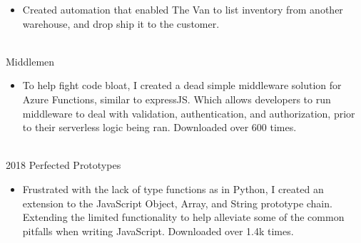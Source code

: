 \documentclass[letterpaper]{twentysecondcv} %
\begin{document}
\begin{twenty}
{\begin{itemize}
            \item Created automation that enabled The Van to list inventory from another warehouse, and drop ship it to the customer. 
        \end{itemize}
        }
    \\
    \twentyitem
    	{}
		{}
        {Middlemen}
        {}
        {}
        {
        \begin{itemize}
            \item To help fight code bloat, I created a dead simple middleware solution for Azure Functions, similar to expressJS. Which allows developers to run middleware to deal with validation, authentication, and authorization, prior to their serverless logic being ran. Downloaded over 600 times. 
            \vspace{1mm}
        \end{itemize}
        }
    \\
    \twentyitem
    	{2018}
		{}
        {Perfected Prototypes}
        {}
        {}
        {
        \begin{itemize}
            \item Frustrated with the lack of type functions as in Python, I created an extension to the JavaScript Object, Array, and String prototype chain. Extending the limited functionality to help alleviate some of the common pitfalls when writing JavaScript. Downloaded over 1.4k times. 
        \end{itemize}
        }
    \end{twenty}
\end{document}
